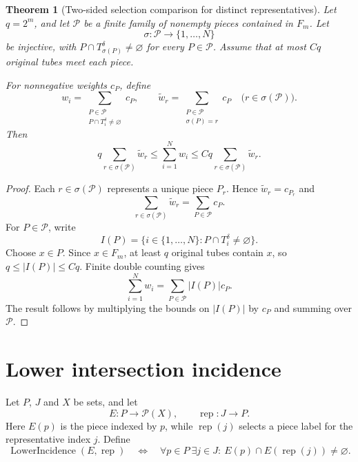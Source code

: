 \documentclass[11pt, letterpaper]{nyjm}
\newtheorem{theorem}{Theorem}[section]
\newcommand{\rep}{\operatorname{rep}}
\newcommand{\LowerIncidence}{\operatorname{LowerIncidence}}
\begin{document}
	
   \begin{theorem}[Two-sided selection comparison for distinct representatives]
   	\label{thm:selection-comparison-sigma}
   	Let $q=2^m$, and let $\mathcal P$ be a finite family of nonempty
   	pieces contained in $F_m$. Let
   	\[
   	\sigma:\mathcal P\longrightarrow\{1,\ldots,N\}
   	\]
   	be injective, with $P\cap T_{\sigma(P)}^\delta\ne\varnothing$
   	for every $P\in\mathcal P$. Assume that at most $Cq$ original tubes
   	meet each piece.
   	
   	For nonnegative weights $c_P$, define
   	\[
   	w_i
   	=\sum_{\substack{P\in\mathcal P\\
   			P\cap T_i^\delta\ne\varnothing}}c_P,
   	\qquad
   	\widetilde w_r
   	=\sum_{\substack{P\in\mathcal P\\ \sigma(P)=r}}c_P
   	\quad\bigl(r\in\sigma(\mathcal P)\bigr).
   	\]
   	Then
   	\begin{equation}
   		\label{eq:selection-comparison-sigma}
   		q\sum_{r\in\sigma(\mathcal P)}\widetilde w_r
   		\le \sum_{i=1}^{N}w_i
   		\le Cq\sum_{r\in\sigma(\mathcal P)}\widetilde w_r.
   	\end{equation}
   \end{theorem}
   
   \begin{proof}
   	Each $r\in\sigma(\mathcal P)$ represents a unique piece $P_r$.
   	Hence $\widetilde w_r=c_{P_r}$ and
   	\[
   	\sum_{r\in\sigma(\mathcal P)}\widetilde w_r
   	=\sum_{P\in\mathcal P}c_P.
   	\]
   	For $P\in\mathcal P$, write
   	\[
   	I(P)=\{i\in\{1,\ldots,N\}:P\cap T_i^\delta\ne\varnothing\}.
   	\]
   	Choose $x\in P$. Since $x\in F_m$, at least $q$ original tubes
   	contain $x$, so $q\le |I(P)|\le Cq$. Finite double counting gives
   	\[
   	\sum_{i=1}^{N}w_i=\sum_{P\in\mathcal P}|I(P)|c_P.
   	\]
   	The result follows by multiplying the bounds on $|I(P)|$ by $c_P$
   	and summing over $\mathcal P$.
   \end{proof}
	\section{Lower intersection incidence}
	
	Let $P$, $J$ and $X$ be sets, and let
	\[
	E:P\longrightarrow\mathcal P(X),\qquad
	\rep:J\longrightarrow P.
	\]
	Here $E(p)$ is the piece indexed by $p$, while $\rep(j)$ selects a
	piece label for the representative index $j$. Define
	\begin{equation}\label{eq:lower-incidence}
		\LowerIncidence(E,\rep)
		\quad\Longleftrightarrow\quad
		\forall p\in P\ \exists j\in J:\ 
		E(p)\cap E(\rep(j))\ne\varnothing.
	\end{equation}
	
\end{document}
